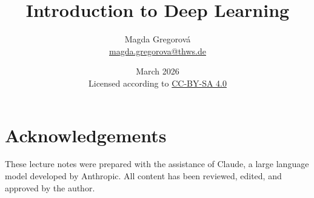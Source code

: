 \documentclass[12pt, a4paper]{scrartcl}
\title{Introduction to Deep Learning}
\author{Magda Gregorová\\
{\small \href{mailto:magda.gregorova@thws.de}{magda.gregorova@thws.de}}}
\date{{\small March 2026 \\[0.3em]
Licensed according to 
\href{https://creativecommons.org/licenses/by-sa/4.0}{CC-BY-SA 4.0}}}
\begin{document}
\maketitle
\tableofcontents
\newpage






 












\section*{Acknowledgements}
These lecture notes were prepared with the assistance of Claude, a large language model developed by Anthropic. All content has been reviewed, edited, and approved by the author.

\newpage
\printbibliography[heading=bibintoc, title={References}]
\end{document}
